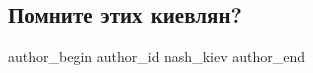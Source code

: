  
 
 
 
 
 
\subsection{Помните этих киевлян?}
\label{sec:22_11_2014.fb.nash_kiev.1.pomnite_etih_kievljan}
 
\ifcmt
 author_begin
   author_id nash_kiev
 author_end
\fi
